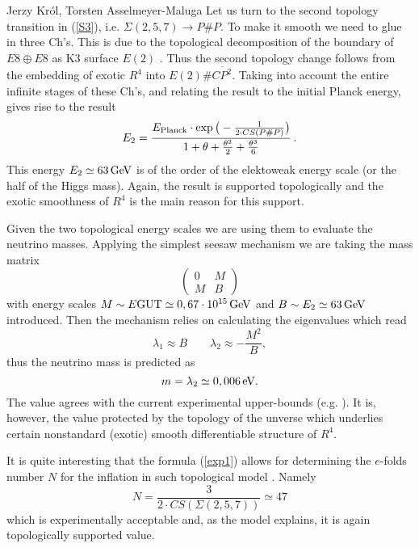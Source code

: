 \begin{artengenv2auth}{Jerzy Kr\'ol, Torsten Asselmeyer-Maluga}
Let us turn to the second topology transition in (\ref{S3}), i.e. $\Sigma(2,5,7)\to P\#P$. To make it smooth we need to glue in three Ch's. This is due to the topological decomposition of the boundary of $E8\oplus E8$ as K3 surface $E(2)$ \parencite{AK2018,AK2019}. Thus the second topology change follows from the embedding of exotic $R^4$ into $E(2)\# \overline{CP^2}$. Taking into account the entire infinite stages of these Ch's, and relating the result to the initial Planck energy, gives rise to the result 
\[E_2=\frac{E_{\rm Planck}\cdot \exp\big(-\frac{1}{2\cdot CS(P\# P)}\big)}{1+\theta +\frac{\theta^2}{2}+\frac{\theta^3}{6}}\,. \]
This energy $E_2\simeq 63\, {\rm GeV}$ is of the order of the elektoweak energy scale (or the half of the Higgs mass). Again, the result is supported topologically and the exotic smoothness of $R^4$ is the main reason for this support. 

Given the two topological energy scales we are using them to evaluate the neutrino masses. Applying the simplest seesaw mechanism we are taking the mass matrix 
\[
\left(\begin{array}{cc}
0 & M\\
M & B
\end{array}\right)
\] with energy scales $M\sim {E\rm GUT}\simeq 0,67\cdot 10^{15}\, {\rm GeV}$ and $B\sim E_2\simeq 63\, {\rm GeV}$ introduced. Then the mechanism relies on calculating the eigenvalues which read \[
\lambda_{1}\approx B\qquad\lambda_{2}\approx-\frac{M^{2}}{B},
\] thus the neutrino mass is predicted as 
\[m=\lambda_2\simeq 0,006\, {\rm eV}.   \] The value agrees with the current experimental upper-bounds (e.g. \cite{PlanckCosmoParam2015,Neutrino2015}). It is, however, the value protected by the topology of the unverse which underlies certain nonstandard (exotic) smooth differentiable structure of $R^4$. 

It is quite interesting that the formula (\ref{exp1}) allows for determining the $e$-folds number $N$ for the inflation in such topological model \parencite{AK2014,AK2019}. Namely
\[N=\frac{3}{2\cdot CS(\Sigma(2,5,7))}\simeq 47 \] which is experimentally acceptable and, as the model explains, it is again topologically supported value.

\end{artengenv2auth}

